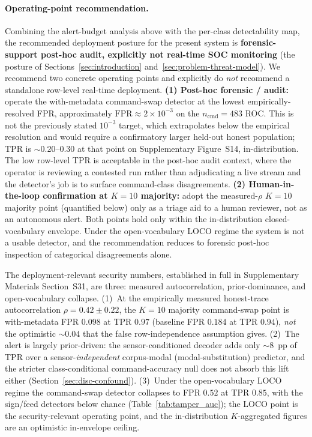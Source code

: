 \documentclass[sensors,article,submit,moreauthors,pdftex]{Definitions/mdpi}
\begin{document}
\paragraph{Operating-point recommendation.} Combining the alert-budget analysis above with the per-class detectability map, the recommended deployment posture for the present system is \textbf{forensic-support post-hoc audit, explicitly not real-time SOC monitoring} (the posture of Sections~\ref{sec:introduction} and~\ref{sec:problem-threat-model}). We recommend two concrete operating points and explicitly do \emph{not} recommend a standalone row-level real-time deployment. \textbf{(1) Post-hoc forensic / audit:} operate the with-metadata command-swap detector at the lowest empirically-resolved FPR, approximately $\mathrm{FPR}\!\approx\!2\!\times\!10^{-3}$ on the $n_{\text{cmd}}\!=\!483$ ROC. This is not the previously stated $10^{-3}$ target, which extrapolates below the empirical resolution and would require a confirmatory larger held-out honest population; TPR is $\sim 0.20$--$0.30$ at that point on Supplementary Figure~S14, in-distribution. The low row-level TPR is acceptable in the post-hoc audit context, where the operator is reviewing a contested run rather than adjudicating a live stream and the detector's job is to surface command-class disagreements. \textbf{(2) Human-in-the-loop confirmation at $K\!=\!10$ majority:} adopt the measured-$\rho$ $K\!=\!10$ majority point (quantified below) only as a triage aid to a human reviewer, not as an autonomous alert. Both points hold only within the in-distribution closed-vocabulary envelope. Under the open-vocabulary LOCO regime the system is not a usable detector, and the recommendation reduces to forensic post-hoc inspection of categorical disagreements alone.

The deployment-relevant security numbers, established in full in Supplementary Materials Section~S31, are three: measured autocorrelation, prior-dominance, and open-vocabulary collapse. (1)~At the empirically measured honest-trace autocorrelation $\rho\!=\!0.42 \pm 0.22$, the $K\!=\!10$ majority command-swap point is with-metadata FPR $0.098$ at TPR $0.97$ (baseline FPR $0.184$ at TPR $0.94$), \emph{not} the optimistic $\sim\!0.04$ that the false row-independence assumption gives. (2)~The alert is largely prior-driven: the sensor-conditioned decoder adds only $\sim\!8$~pp of TPR over a sensor-\emph{independent} corpus-modal (modal-substitution) predictor, and the stricter class-conditional command-accuracy null does not absorb this lift either (Section~\ref{sec:disc-confound}). (3)~Under the open-vocabulary LOCO regime the command-swap detector collapses to FPR $0.52$ at TPR $0.85$, with the sign/feed detectors below chance (Table~\ref{tab:tamper_auc}); the LOCO point is the security-relevant operating point, and the in-distribution $K$-aggregated figures are an optimistic in-envelope ceiling.
\end{document}

